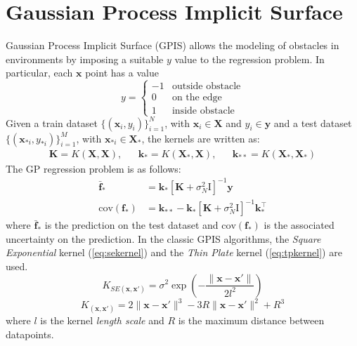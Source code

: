 \documentclass[10pt,a4paper,twocolumn]{article}
\newcommand{\trsp}{{\scriptscriptstyle\top}}
\newcommand{\cov}{\mathrm{cov}}
\begin{document}
\section{Gaussian Process Implicit Surface}\label{GPIS}
Gaussian Process Implicit Surface (GPIS) allows the modeling of obstacles in environments by imposing a suitable $y$ value to the regression problem. In particular, each $\mathbf{x}$ point has a value
\begin{equation}
	y = 
	\begin{cases}
		-1 & \text{outside obstacle}\\
		0 & \text{on the edge}\\
		1 & \text{inside obstacle}
	\end{cases}
\end{equation}
Given a train dataset $ \{ (\mathbf{x}_i, y_i) \}_{i=1}^N$, with $\mathbf{x}_i \in \mathbf{X}$ and $y_i \in \mathbf{y}$ and a test dataset $\{ (\mathbf{x}_{*i}, y_{*i}) \}_{i=1}^M$, with $\mathbf{x}_{*i} \in \mathbf{X_*}$, the kernels are written as:
\small
\begin{align}
	\mathbf{K} = K(\mathbf{X},\mathbf{X}), && \mathbf{k_*} = K(\mathbf{X_*},\mathbf{X}), && \mathbf{k_{**}} = K(\mathbf{X_*},\mathbf{X_*})
\end{align}
\normalsize
The GP regression problem is as follows:
\begin{equation}\label{eq:GPregr}
	\begin{aligned}
		\mathbf{\bar{f}_*} &= \mathbf{k}_*[\mathbf{K} + \sigma_N^2 \mathrm{I}]^{-1}\mathbf{y}\\    
		\cov(\mathbf{f}_*) &= \mathbf{k}_{**} - \mathbf{k}_*[\mathbf{K} + \sigma_N^2 \mathrm{I}]^{-1}\mathbf{k}_*^\trsp
	\end{aligned}
\end{equation}
where $\mathbf{\bar{f}_*}$ is the prediction on the test dataset and $\cov(\mathbf{f}_*)$ is the associated uncertainty on the prediction.
In the classic GPIS algorithms, the \textit{Square Exponential} kernel (\autoref{eq:sekernel}) and the \textit{Thin Plate} kernel (\autoref{eq:tpkernel}) are used.
\begin{equation}\label{eq:sekernel}
	K_{SE(\mathbf{x}, \mathbf{x'})}  = \sigma^2 \exp \left( -\frac{\| \mathbf{x} - \mathbf{x'} \|}{2 l^2} \right)
\end{equation}
\begin{equation}\label{eq:tpkernel}
	K_{(\mathbf{x}, \mathbf{x'})} = 2\|\mathbf{x} - \mathbf{x'}\|^3 - 3R \|\mathbf{x} - \mathbf{x'}\|^2 + R^3
\end{equation}
where $l$ is the kernel \textit{length scale} and $R$ is the maximum distance between datapoints.
\end{document}
